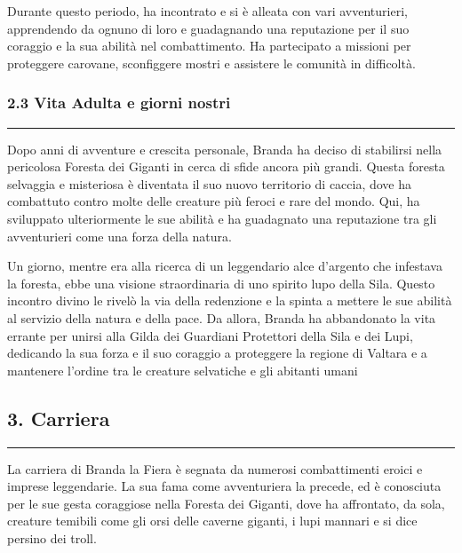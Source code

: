 Durante questo periodo, ha incontrato e si è alleata con vari
avventurieri, apprendendo da ognuno di loro e guadagnando una
reputazione per il suo coraggio e la sua abilità nel combattimento. Ha
partecipato a missioni per proteggere carovane, sconfiggere mostri e
assistere le comunità in difficoltà.

\subsubsection{2.3 Vita Adulta e giorni
nostri}\label{vita-adulta-e-giorni-nostri}

\begin{center}\rule{0.5\linewidth}{0.5pt}\end{center}

Dopo anni di avventure e crescita personale, Branda ha deciso di
stabilirsi nella pericolosa Foresta dei Giganti in cerca di sfide ancora
più grandi. Questa foresta selvaggia e misteriosa è diventata il suo
nuovo territorio di caccia, dove ha combattuto contro molte delle
creature più feroci e rare del mondo. Qui, ha sviluppato ulteriormente
le sue abilità e ha guadagnato una reputazione tra gli avventurieri come
una forza della natura.

Un giorno, mentre era alla ricerca di un leggendario alce d'argento che
infestava la foresta, ebbe una visione straordinaria di uno spirito lupo
della Sila. Questo incontro divino le rivelò la via della redenzione e
la spinta a mettere le sue abilità al servizio della natura e della
pace. Da allora, Branda ha abbandonato la vita errante per unirsi alla
Gilda dei Guardiani Protettori della Sila e dei Lupi, dedicando la sua
forza e il suo coraggio a proteggere la regione di Valtara e a mantenere
l'ordine tra le creature selvatiche e gli abitanti umani

\subsection{3. Carriera}\label{carriera}

\begin{center}\rule{0.5\linewidth}{0.5pt}\end{center}

La carriera di Branda la Fiera è segnata da numerosi combattimenti
eroici e imprese leggendarie. La sua fama come avventuriera la precede,
ed è conosciuta per le sue gesta coraggiose nella Foresta dei Giganti,
dove ha affrontato, da sola, creature temibili come gli orsi delle
caverne giganti, i lupi mannari e si dice persino dei troll.


